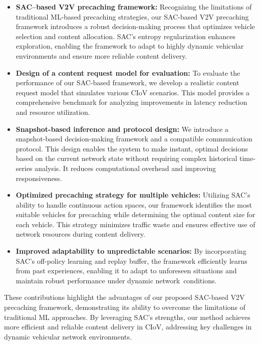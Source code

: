 \documentclass{aims}
\numberwithin{equation}{section}
\begin{document}
\begin{itemize}
    \item \textbf{SAC--based V2V precaching framework:} Recognizing the limitations of traditional ML-based precaching strategies, our SAC-based V2V precaching framework introduces a robust decision-making process that optimizes vehicle selection and content allocation. SAC's entropy regularization enhances exploration, enabling the framework to adapt to highly dynamic vehicular environments and ensure more reliable content delivery.
    \item \textbf{Design of a content request model for evaluation:} To evaluate the performance of our SAC-based framework, we develop a realistic content request model that simulates various CIoV scenarios. This model provides a comprehensive benchmark for analyzing improvements in latency reduction and resource utilization.
    \item \textbf{Snapshot-based inference and protocol design:} We introduce a snapshot-based decision-making framework and a compatible communication protocol. This design enables the system to make instant, optimal decisions based on the current network state without requiring complex historical time-series analysis. It reduces computational overhead and improving responsiveness.
    \item \textbf{Optimized precaching strategy for multiple vehicles:} Utilizing SAC's ability to handle continuous action spaces, our framework identifies the most suitable vehicles for precaching while determining the optimal content size for each vehicle. This strategy minimizes traffic waste and ensures effective use of network resources during content delivery.
    \item \textbf{Improved adaptability to unpredictable scenarios:} By incorporating SAC's off-policy learning and replay buffer, the framework efficiently learns from past experiences, enabling it to adapt to unforeseen situations and maintain robust performance under dynamic network~conditions.
\end{itemize}

These contributions highlight the advantages of our proposed SAC-based V2V precaching framework, demonstrating its ability to overcome the limitations of traditional ML approaches. By leveraging SAC's strengths, our method achieves more efficient and reliable content delivery in CIoV, addressing key challenges in dynamic vehicular network environments.
\end{document}
